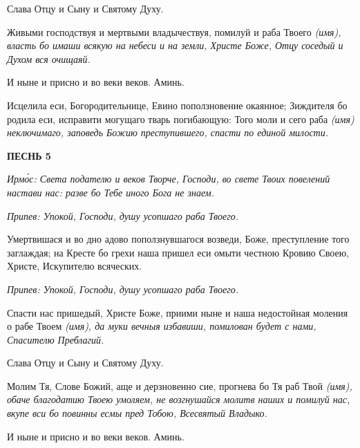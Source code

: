    Слава Отцу и Сыну и Святому Духу.



   Живыми господствуя и мертвыми владычествуя, помилуй и раба Твоего \itshape 
(имя)\normalfont{}, власть бо имаши всякую на небеси и на земли, Христе Боже, Отцу
соседый и Духом вся очищаяй.



   И ныне и присно и во веки веков. Аминь.



   Исцелила еси, Богородительнице, Евино поползновение окаянное;
Зиждителя бо родила еси, исправити могущаго тварь погибающую: Того
моли и сего раба \itshape  (имя)\normalfont{} неключимаго, заповедь Божию преступившего,
спасти по единой милости.



 

\bfseries ПЕСНЬ 5\normalfont{}


 \itshape Ирмо́с:\normalfont{} Света подателю и веков Творче, Господи, во свете Твоих повелений
настави нас: разве бо Тебе иного Бога не знаем.



 \itshape Припев:\normalfont{} Упокой, Господи, душу усопшаго раба Твоего.



   Умертвишася и во дно адово поползнувшагося возведи, Боже,
преступление того заглаждая; на Кресте бо грехи наша пришел еси омыти
честною Кровию Своею, Христе, Искупителю всяческих.



 \itshape Припев:\normalfont{} Упокой, Господи, душу усопшаго раба Твоего.



   Спасти нас пришедый, Христе Боже, приими ныне и наша недостойная
моления о рабе Твоем \itshape  (имя)\normalfont{}, да муки вечныя избавиши, помилован будет с
нами, Спасителю Преблагий.



   Слава Отцу и Сыну и Святому Духу.



   Молим Тя, Слове Божий, аще и дерзновенно сие, прогнева бо Тя раб
Твой \itshape  (имя)\normalfont{}, обаче благодатию Твоею умоляем, не возгнушайся молитв
наших и помилуй нас, вкупе вси бо повинны есмы пред Тобою, Всесвятый
Владыко.



   И ныне и присно и во веки веков. Аминь.



